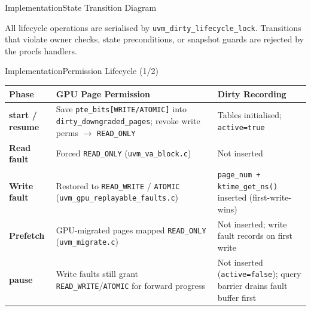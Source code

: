 \begin{frame}[c]{Implementation}{State Transition Diagram}
\begin{center}
{
}
\end{center}
\vspace{2mm}
{\small All lifecycle operations are serialised by \texttt{uvm\_dirty\_lifecycle\_lock}. Transitions that violate owner checks, state preconditions, or snapshot guards are rejected by the procfs handlers.}
\end{frame}

\begin{frame}[c]{Implementation}{Permission Lifecycle (1/2)}
\begin{center}
\renewcommand{\arraystretch}{1.3}
\footnotesize
\begin{tabular}{p{22mm} p{58mm} p{52mm}}
\toprule
\textbf{Phase} & \textbf{GPU Page Permission} & \textbf{Dirty Recording} \\
\midrule
\textbf{start / resume} &
    Save \texttt{pte\_bits[WRITE/ATOMIC]} into \texttt{dirty\_downgraded\_pages}; revoke write perms $\to$ \texttt{READ\_ONLY} &
    Tables initialised; \texttt{active=true} \\
\textbf{Read fault} &
    Forced \texttt{READ\_ONLY} (\texttt{uvm\_va\_block.c}) &
    Not inserted \\
\textbf{Write fault} &
    Restored to \texttt{READ\_WRITE} / \texttt{ATOMIC} (\texttt{uvm\_gpu\_replayable\_faults.c}) &
    \texttt{page\_num + ktime\_get\_ns()} inserted (first-write-wins) \\
\textbf{Prefetch} &
    GPU-migrated pages mapped \texttt{READ\_ONLY} (\texttt{uvm\_migrate.c}) &
    Not inserted; write fault records on first write \\
\textbf{pause} &
    Write faults still grant \texttt{READ\_WRITE}/\texttt{ATOMIC} for forward progress &
    Not inserted (\texttt{active=false}); query barrier drains fault buffer first \\
\bottomrule
\end{tabular}
\end{center}
\end{frame}

